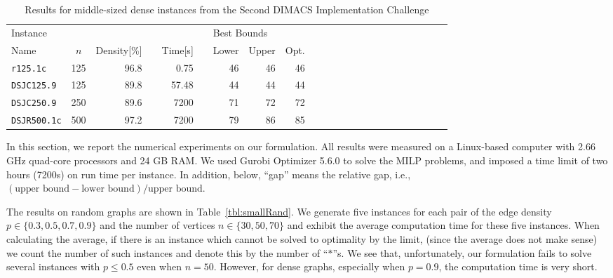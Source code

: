 \documentclass[11pt,a4paper]{article}
\begin{document}
\begin{table}[tb]
\caption{Results for middle-sized dense instances from the Second DIMACS Implementation Challenge \label{tbl:middleDMCS}}
\begin{center}
{\small
\begin{tabular}{lrrrrrrrrrrrrrrrrrrrrrr}
\toprule
\multicolumn{3}{l}{Instance}	&&		&&\multicolumn{2}{l}{Best Bounds}		\\	\cline{1-3} \cline{7-8}
\multicolumn{1}{l}{Name}	&\multicolumn{1}{c}{$n$}	&\multicolumn{1}{l}{Density[\%]}
&&\multicolumn{1}{l}{Time[s]}
&&Lower	&Upper	& Opt. \\
\midrule	
\texttt{r125.1c}		&	125	&96.8	&&	0.75		&&	46	&	46 	& 46 \\	
\texttt{DSJC125.9}	&	125	&89.8	&&	57.48		&&	44	&	44 	& 44 \cite{GuMa}\\	
\texttt{DSJC250.9}	&	250	&89.6	&&	7200		&&	71 	&	72 	& 72 \cite{HeCoSe}\\	
\texttt{DSJR500.1c}	&	500	&97.2	&&	7200		&&	79	&	86 	& 85 \cite{GuMa}\\
\bottomrule
\end{tabular}
}
\end{center}
\end{table}


In this section, we report the numerical experiments on our formulation. 
All results were measured on a Linux-based computer with 2.66 GHz quad-core processors and 24 GB RAM. 
We used Gurobi Optimizer 5.6.0 to solve the MILP problems, 
and imposed a time limit of two hours (7200s) on run time per instance. 
In addition, below, ``gap'' means the relative gap, i.e., $(\mbox{upper bound} - \mbox{lower bound}) / \mbox{upper bound}$. 

\par 

The results on random graphs are shown in Table~\ref{tbl:smallRand}. 
We generate five instances for each pair of 
the edge density $p \in \{0.3, 0.5, 0.7, 0.9\} $ and the number of vertices $n \in \{30, 50, 70\}$ 
and exhibit the average computation time for these five instances.  
When calculating the average, 
if there is an instance which cannot be solved to optimality by the limit, 
(since the average does not make sense) 
we count the number of such instances and denote this by the number of ``$*$''s. 
We see that, unfortunately, our formulation fails to solve several instances with $p \le 0.5$ even when $n=50$. 
However, for dense graphs, especially when $p=0.9$, the computation time is very short. 
\end{document}
